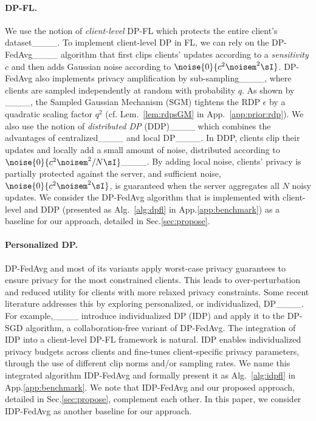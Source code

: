 \paragraph{DP-FL.}
We use the notion of \textit{client-level} DP-FL which protects the entire client's dataset____. To implement client-level DP in FL, 
we can rely on the DP-FedAvg____ algorithm that first clips clients' updates according to a \textit{sensitivity} $c$ and then adds Gaussian noise according to $\noise{0}{c^2\noisem^2\sI}$. DP-FedAvg also implements privacy amplification by sub-sampling____, where clients are sampled independently at random with probability $q$. As shown by ____, the Sampled Gaussian Mechanism (SGM) %
{tightens the RDP $\epsilon$ by a quadratic scaling factor $q^2$ (cf. Lem.~\ref{lem:rdpsGM} in App.~\ref{app:prior:rdp}).} We also use the notion of \textit{distributed DP} (DDP)____ which combines the advantages of centralized____ and local DP____. In DDP, clients clip their updates and locally add a small amount of noise, distributed according to $\noise{0}{{c^2\noisem^2}/{N}\sI}$____. By adding local noise, clients' privacy is partially protected against the server, and sufficient noise, $\noise{0}{c^2\noisem^2\sI}$, is guaranteed when the server aggregates all $N$ noisy updates. We consider the DP-FedAvg algorithm that is implemented with client-level and DDP (presented as Alg.~\ref{alg:dpfl} in App.\ref{app:benchmark}) as a baseline for our approach, detailed in Sec.\ref{sec:propose}.


\paragraph{Personalized DP.}
DP-FedAvg and most of its variants apply worst-case privacy guarantees to ensure privacy for the most constrained clients. This leads to over-perturbation and reduced utility for clients with more relaxed privacy constraints. Some recent literature addresses this by exploring personalized, or individualized, DP____. For example,____ introduce individualized DP (IDP) and apply it to the DP-SGD algorithm, a collaboration-free variant of DP-FedAvg. The integration of IDP into a client-level DP-FL framework is natural. IDP enables individualized privacy budgets across clients and fine-tunes client-specific privacy parameters, through the use of different clip norms and/or sampling rates. We name this integrated algorithm IDP-FedAvg and formally present it as Alg.~\ref{alg:idpfl} in App.\ref{app:benchmark}. We note that IDP-FedAvg and our proposed approach, detailed in Sec.\ref{sec:propose}, complement each other. In this paper, we consider IDP-FedAvg as another baseline for our approach.


